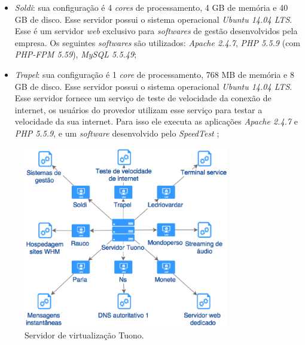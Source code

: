 \begin{itemize}
 \item \textit{Soldi}: sua configuração é 4 \textit{cores} de processamento, 4 GB de memória e 40 GB de disco. Esse servidor possui o 
 sistema operacional \textit{Ubuntu 14.04 \ac{LTS}}. Esse é um servidor \textit{web} exclusivo para \textit{softwares} de gestão desenvolvidos
 pela empresa. Os seguintes \textit{softwares} são utilizados: \textit{Apache 2.4.7}, \textit{\ac{PHP} 5.5.9} (com \textit{PHP-FPM 5.59}), 
 \textit{MySQL 5.5.49};
 
 \item \textit{Trapel}: sua configuração é 1 \textit{core} de processamento, 768 MB de memória e 8 GB de disco. Esse servidor possui o 
 sistema operacional \textit{Ubuntu 14.04 \ac{LTS}}. Esse servidor fornece um serviço de teste de velocidade da conexão de internet, os 
 usuários do provedor utilizam esse serviço para testar a velocidade da sua internet. Para isso ele executa as aplicações \textit{Apache 2.4.7} e
 \textit{\ac{PHP} 5.5.9}, e um \textit{software} desenvolvido pelo \textit{SpeedTest} \cite{speedtest};
\end{itemize}

\begin{figure}[h!]
 \centering
 \includegraphics[width=340px]{img/serv_tuono.eps}
 \caption{Servidor de virtualização Tuono.}
 \label{fig:serv_tuono}
\end{figure}

